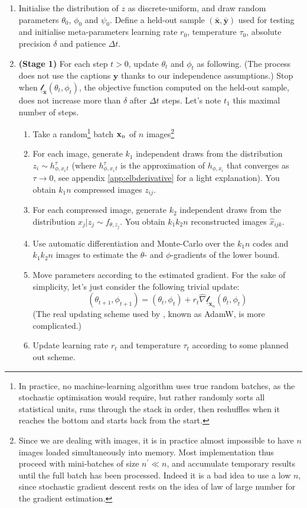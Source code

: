\documentclass{article}
\begin{document}
\begin{appendix}
\begin{multicols}{2}
\begin{enumerate}
    \item Initialise the distribution of $z$ as discrete-uniform, and draw random parameters $\theta_0$,  $\phi_0$ and $\psi_0$. Define a held-out sample $(\bar{\mathbf{x}},\bar{\mathbf{y}})$ used for testing and initialise meta-parameters learning rate $r_0$, temperature $\tau_0$, absolute precision $\delta$ and patience $\Delta t$.
    \item \textbf{(Stage 1)} For each step $t>0$, update $\theta_t$ and $\phi_t$ as following. (The process does not use the captions $\mathbf{y}$ thanks to our independence assumptions.) Stop when $\underline{\mathscr{l}}_{\bar{\mathbf{x}}}(\theta_t,\phi_t)$, the objective function computed on the held-out sample, does not increase more than $\delta$ after $\Delta t$ steps. Let's note $t_1$ this maximal number of steps.
    \begin{enumerate}
    \item Take a random\footnote{In practice, no machine-learning algorithm uses true random batches, as the stochastic optimisation would require, but rather randomly sorts all statistical units, runs through the stack in order, then reshuffles when it reaches the bottom and starts back from the start.} batch $\mathbf{x}_n$ of $n$ images\footnote{Since we are dealing with images, it is in practice almost impossible to have $n$ images loaded simultaneously into memory. Most implementation thus proceed with mini-batches of size $n^\prime\ll n$, and accumulate temporary results until the full batch has been processed. Indeed it is a bad idea to use a low $n$, since stochastic gradient descent rests on the idea of law of large number for the gradient estimation.}
    \item For each image, generate $k_1$ independent draws from the distribution $z_i\sim h_{\phi,x_i}^\tau_t$ (where $h_{\phi,x_i}^\tau_t$ is the approximation of $h_{\phi,x_i}$ that converges as $\tau \to 0$, see appendix \ref{app:elbderivative} for a light explanation). You obtain $k_1n$ compressed images $z_{ij}$.
    \item For each compressed image, generate $k_2$ independent draws from the distribution $x_j|z_j\sim f_{\theta,z_j}$. You obtain $k_1k_2n$ reconstructed images $\hat x_{ijk}$.
    \item Use automatic differentiation and Monte-Carlo over the $k_1n$ codes and $k_1k_2n$ images to estimate the $\theta$- and $\phi$-gradients of the lower bound.
    \item Move parameters according to the estimated gradient. For the sake of simplicity, let's just consider the following trivial update: $$(\theta_{t+1},\phi_{t+1})=(\theta_{t},\phi_{t})+r_t\hat{\nabla}\underline{\mathscr{l}}_{\mathbf{x}_n}(\theta_{t},\phi_{t})$$
    (The real updating scheme used by \citeauthor{zeroshot}, known as AdamW, is more complicated.)
    \item Update learning rate $r_t$ and temperature $\tau_t$ according to some planned out scheme.
    \end{enumerate}
    

\end{enumerate}
\end{multicols}
\end{appendix}
\end{document}
